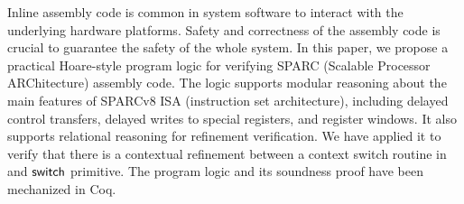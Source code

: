 Inline assembly code is common in system software to interact with
the underlying hardware platforms. Safety and correctness of the
assembly code is crucial to guarantee the safety of the whole
system. In this paper, we propose a practical Hoare-style program
logic for verifying SPARC (Scalable Processor ARChitecture) assembly code. The logic supports
modular reasoning about the main features of 
SPARCv8 ISA (instruction set architecture), including
delayed control transfers, delayed writes to special registers,
and register windows. 
It also supports relational reasoning for refinement 
verification. We have applied it to verify that 
there is a contextual refinement 
between a context switch routine in \sparc{} and 
$\mathsf{switch}{}$ primitive. The program logic and its soundness proof 
have been mechanized in Coq. 
